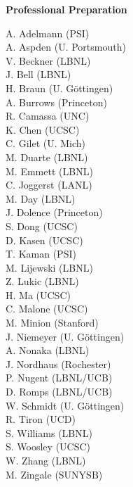 \documentclass[11pt,letterpaper,english]{article}
\begin{document}
\begin{flushleft} {\bf Professional Preparation}
{A. Adelmann (PSI)\\
A. Aspden (U. Portsmouth)\\
V. Beckner (LBNL)\\
J. Bell (LBNL)\\
H. Braun (U. G\"{o}ttingen)\\
A. Burrows (Princeton)\\
R. Camassa (UNC)\\
K. Chen (UCSC)\\
C. Gilet (U. Mich)\\
M. Duarte (LBNL)\\
M. Emmett (LBNL)\\
C. Joggerst (LANL)\\
M. Day (LBNL)\\
J. Dolence (Princeton)\\
S. Dong (UCSC)\\
D. Kasen (UCSC)\\
T. Kaman (PSI)\\
M. Lijewski (LBNL)\\
Z. Lukic (LBNL)\\
H. Ma (UCSC)\\
C. Malone (UCSC)\\
M. Minion (Stanford)\\
J. Niemeyer (U. G\"{o}ttingen)\\
A. Nonaka (LBNL)\\
J. Nordhaus (Rochester)\\
P. Nugent (LBNL/UCB)\\
D. Romps (LBNL/UCB)\\
W. Schmidt (U. G\"{o}ttingen)\\
R. Tiron (UCD)\\
S. Williams (LBNL)\\
S. Woosley (UCSC)\\
W. Zhang (LBNL)\\
M. Zingale (SUNYSB)

}


\end{flushleft}
\end{document}
